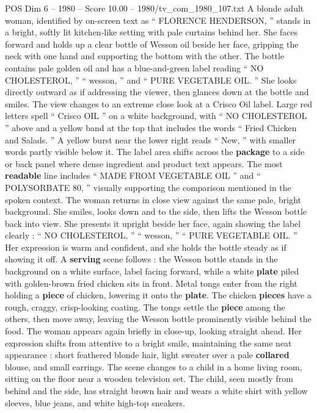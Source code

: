\begin{textsample}{POS Dim 6 – 1980 – Score 10.00 – 1980/tv\_com\_1980\_107.txt}  \label{ex:f6_pos_038}
A blonde adult woman, identified by on-screen text as “ FLORENCE HENDERSON, ” stands in a bright, softly lit kitchen-like setting with pale curtains behind her.
She faces forward and holds up a clear bottle of Wesson oil beside her face, gripping the neck with one hand and supporting the bottom with the other.
The bottle contains pale golden oil and has a blue-and-green label reading “ NO CHOLESTEROL, ” “ wesson, ” and “ PURE VEGETABLE OIL. ” She looks directly outward as if addressing the viewer, then glances down at the bottle and smiles.
The view changes to an extreme close look at a Crisco Oil label.
Large red letters spell “ Crisco OIL ” on a white background, with “ NO CHOLESTEROL ” above and a yellow band at the top that includes the words “ Fried Chicken and Salads. ” A yellow burst near the lower right reads “ New, ” with smaller words partly visible below it.
The label area shifts across the \textbf{package} to a side or back panel where dense ingredient and product text appears.
The most \textbf{readable} line includes “ MADE FROM VEGETABLE OIL ” and “ POLYSORBATE 80, ” visually supporting the comparison mentioned in the spoken context.
The woman returns in close view against the same pale, bright background.
She smiles, looks down and to the side, then lifts the Wesson bottle back into view.
She presents it upright beside her face, again showing the label clearly : “ NO CHOLESTEROL, ” “ wesson, ” “ PURE VEGETABLE OIL. ” Her expression is warm and confident, and she holds the bottle steady as if showing it off.
A \textbf{serving} scene follows : the Wesson bottle stands in the background on a white surface, label facing forward, while a white \textbf{plate} piled with golden-brown fried chicken sits in front.
Metal tongs enter from the right holding a \textbf{piece} of chicken, lowering it onto the \textbf{plate}.
The chicken \textbf{pieces} have a rough, craggy, crisp-looking coating.
The tongs settle the \textbf{piece} among the others, then move away, leaving the Wesson bottle prominently visible behind the food.
The woman appears again briefly in close-up, looking straight ahead.
Her expression shifts from attentive to a bright smile, maintaining the same neat appearance : short feathered blonde hair, light sweater over a pale \textbf{collared} blouse, and small earrings.
The scene changes to a child in a home living room, sitting on the floor near a wooden television set.
The child, seen mostly from behind and the side, has straight brown hair and wears a white shirt with yellow sleeves, blue jeans, and white high-top sneakers.

\end{textsample}
